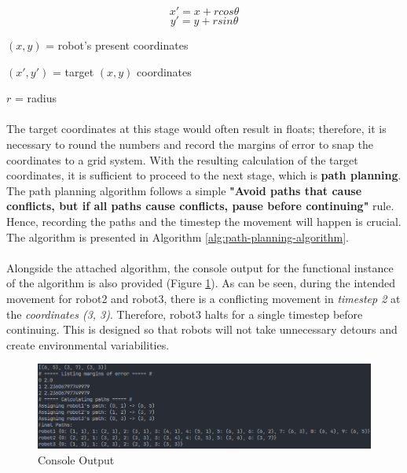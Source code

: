 \[x' = x + rcos\theta\]
\[y' = y + rsin\theta\]

\begin{description}
    \item 
    \item[where:]
    \item \((x, y)\) = robot's present coordinates
    \item \((x', y')\) = target \((x, y)\) coordinates
    \item \(r\) = radius
\end{description}

\paragraph*{}
The target coordinates at this stage would often result in floats; therefore, it is necessary to round the numbers and record the margins of error to snap the coordinates to a grid system. With the resulting calculation of the target coordinates, it is sufficient to proceed to the next stage, which is \textbf{path planning}. The path planning algorithm follows a simple \textbf{"Avoid paths that cause conflicts, but if all paths cause conflicts, pause before continuing"} rule. Hence, recording the paths and the timestep the movement will happen is crucial. The algorithm is presented in Algorithm \ref{alg:path-planning-algorithm}.

\paragraph*{}
Alongside the attached algorithm, the console output for the functional instance of the algorithm is also provided (Figure \ref{fig:formation_console_output}). As can be seen, during the intended movement for robot2 and robot3, there is a conflicting movement in \textit{timestep 2} at the \textit{coordinates (3, 3)}. Therefore, robot3 halts for a single timestep before continuing. This is designed so that robots will not take unnecessary detours and create environmental variabilities.

\begin{figure}[H]
    \centering
    \includegraphics[width=1\linewidth]{assets/images/formation/console_output.png}
    \caption{Console Output}
    \label{fig:formation_console_output}
\end{figure}

